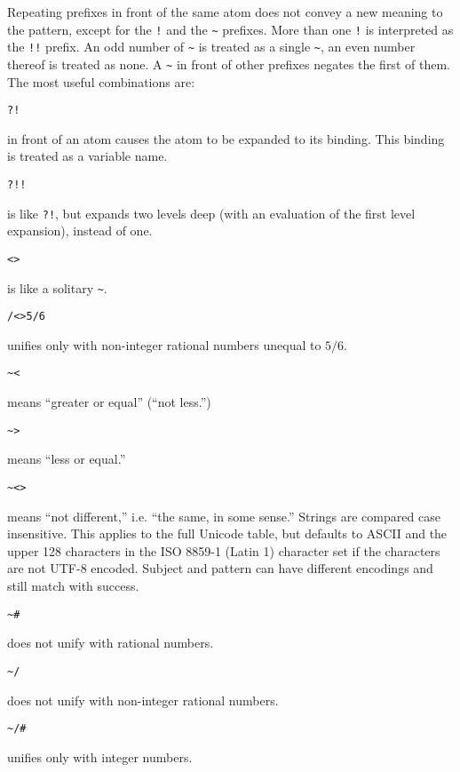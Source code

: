 \documentclass[12pt]{article}
\begin{document}
Repeating prefixes in front of the same atom does not convey a new
meaning to the pattern, except for the \verb|!| and the \verb|~|
prefixes. More than one \verb|!| is interpreted as the \verb|!!|
prefix. An odd number of \verb|~| is treated as a single \verb|~|, an
even number thereof is treated as none. A \verb|~| in front of other
prefixes negates the first of them. The most useful combinations are:
\begin{description}
\item \verb|?!|\par
  in front of an atom causes the atom to be expanded to its
  binding. This binding is treated as a variable name.

\item \verb|?!!|\par
  is like \verb|?!|, but expands two levels deep (with an evaluation
  of the first level expansion), instead of one.

\item \verb|<>|\par
  is like a solitary \verb|~|.

\item \verb|/<>5/6|\par
  unifies only with non-integer rational numbers unequal to $5/6$.

\item \verb|~<|\par
  means ``greater or equal'' (``not less.'')

\item \verb|~>|\par
  means ``less or equal.''

\item \verb|~<>|\par
  means ``not different,'' i.e. ``the same, in some sense.'' Strings
  are compared case insensitive. This applies to the full Unicode
  table, but defaults to ASCII and the upper 128 characters in the ISO
  8859-1 (Latin 1) character set if the characters are not UTF-8
  encoded. Subject and pattern can have different encodings and still
  match with success.

\item \verb|~#|\par
  does not unify with rational numbers.

\item \verb|~/|\par
  does not unify with non-integer rational numbers.

\item \verb|~/#|\par
  unifies only with integer numbers.


\end{description}
\end{document}

